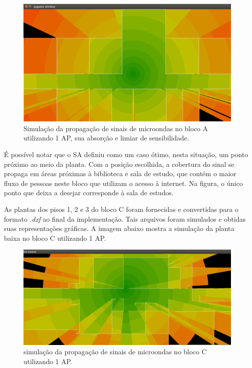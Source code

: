 \documentclass[
	12pt,				%
	openright,			%
	twoside,			%
	a4paper,			%
	english,			%
	french,				%
	spanish,			%
	brazil				%
	]{abntex2}
\begin{document}
\begin{figure}[ht]
	\caption{\label{prop-bloco-a}Simulação da propagação de sinais de microondas no bloco A utilizando 1 AP, sua absorção e limiar de sensibilidade.}
	\begin{center}
		\includegraphics[scale=0.4]{images/prop-bloco-a.jpg}
	\end{center}
\end{figure}

É possível notar que o SA definiu como um caso ótimo, nesta situação, um ponto próximo ao meio da planta. Com a posição escolhida, a cobertura do sinal se propaga em áreas próximas à biblioteca e sala de estudo, que contém o maior fluxo de pessoas neste bloco que utilizam o acesso à internet. Na figura, o único ponto que deixa a desejar corresponde à sala de estudos.

As plantas dos pisos 1, 2 e 3 do bloco C foram fornecidas e convertidas para o formato \textit{.dxf }ao final da implementação. Tais arquivos foram simulados e obtidas suas representações gráficas. A imagem abaixo mostra a simulação da planta baixa no bloco C utilizando 1 AP.

\begin{figure}[ht]
	\caption{\label{captura-zona}simulação da propagação de sinais de microondas no bloco C utilizando 1 AP.
		}
	\begin{center}
		\includegraphics[scale=0.4]{images/captura-zona.jpg}
	\end{center}
\end{figure}
\end{document}
